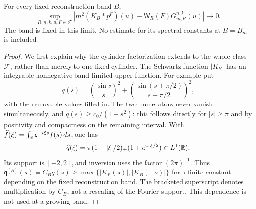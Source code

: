 \begin{lemma}
\label{lem:v52-fixed-band-path}
For every fixed reconstruction band $B$,
\begin{equation}\label{eq:v52-fixed-band-path}
 \sup_{R,n,k,u,F\in\mathcal F}
 \left|m^2(K_B*p^F)(u)
      -\mathsf W_R(F)G_{m,R}^{n,k}(u)\right|\longrightarrow0.
\end{equation}
The band is fixed in this limit. No estimate for its spectral
constants at $B=B_m$ is included.
\end{lemma}
\begin{proof}
We first explain why the cylinder factorization extends to the whole
class $\mathcal F$, rather than merely to one fixed cylinder.
The Schwartz function $|K_B|$ has an integrable nonnegative
band-limited upper function. For example put
\[
 q(s)=\left(\frac{\sin s}{s}\right)^2+
       \left(\frac{\sin(s+\pi/2)}{s+\pi/2}\right)^2,
\]
with the removable values filled in. The two numerators never vanish
simultaneously, and $q(s)\ge c_0/(1+s^2)$: this follows directly for
$|s|\ge\pi$ and by positivity and compactness on the remaining
interval. With $\widehat f(\xi)=\int_{\mathbb R}e^{-i\xi s}f(s)\,ds$, one has
\[
 \widehat q(\xi)=\pi(1-|\xi|/2)_+
                       (1+e^{i\pi\xi/2})\in L^1(\mathbb R).
\]
Its support is $[-2,2]$, and inversion uses the factor $(2\pi)^{-1}$.
Thus $\mathsf q^{[B]}(s)=C_Bq(s)\ge\max\{|K_B(s)|,|K_B(-s)|\}$
for a finite constant depending on the fixed reconstruction band.
The bracketed superscript denotes multiplication by $C_B$, not a
rescaling of the Fourier support. This dependence is not used at a
growing band.


\end{proof}
